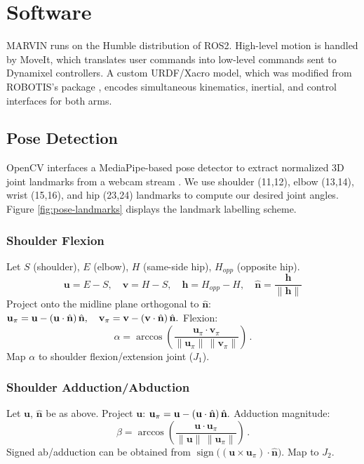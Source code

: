 \documentclass[acmsmall, screen]{acmart}
\begin{document}
\section{Software}
MARVIN runs on the Humble distribution of ROS2. High-level motion is handled by MoveIt, which translates user commands into low-level commands sent to Dynamixel controllers. A custom URDF/Xacro model, which was modified from ROBOTIS's package \cite{OpenManipulator2025}, encodes simultaneous kinematics, inertial, and control interfaces for both arms.

\subsection{Pose Detection}
OpenCV interfaces a MediaPipe-based pose detector to extract normalized 3D joint landmarks from a webcam stream \cite{noauthor_mediapipe_nodate}. We use shoulder (11,12), elbow (13,14), wrist (15,16), and hip (23,24) landmarks to compute our desired joint angles. Figure \ref{fig:pose-landmarks} displays the landmark labelling scheme.

\subsubsection{Shoulder Flexion}
Let $S$ (shoulder), $E$ (elbow), $H$ (same-side hip), $H_{opp}$ (opposite hip).
\begin{displaymath}
  \mathbf{u}=E-S,\quad \mathbf{v}=H-S,\quad \mathbf{h}=H_{opp}-H,\quad \hat{\mathbf{n}}=\frac{\mathbf{h}}{\lVert\mathbf{h}\rVert}
\end{displaymath}
Project onto the midline plane orthogonal to $\hat{\mathbf{n}}$:
$
\mathbf{u}_\pi=\mathbf{u}-(\mathbf{u}\cdot\hat{\mathbf{n}})\,\hat{\mathbf{n}},\quad
\mathbf{v}_\pi=\mathbf{v}-(\mathbf{v}\cdot\hat{\mathbf{n}})\,\hat{\mathbf{n}}. \\
$
Flexion:
\begin{equation}
\alpha=\arccos \!\left( \frac{\mathbf{u}_\pi \cdot \mathbf{v}_\pi}{\lVert\mathbf{u}_\pi\rVert\, \lVert\mathbf{v}_\pi\rVert} \right)\,.
\end{equation}
Map $\alpha$ to shoulder flexion/extension joint ($J_1$).

\subsubsection{Shoulder Adduction/Abduction}
Let $\mathbf{u}$, $\hat{\mathbf{n}}$ be as above. Project $\mathbf{u}$:
$
\mathbf{u}_\pi=\mathbf{u}-(\mathbf{u}\cdot\hat{\mathbf{n}})\,\hat{\mathbf{n}}.\\
$
Adduction magnitude:
\begin{equation}
\beta=\arccos \!\left( \frac{\mathbf{u}\cdot\mathbf{u}_\pi}{\lVert\mathbf{u}\rVert\, \lVert\mathbf{u}_\pi\rVert} \right)\,.
\end{equation}
Signed ab/adduction can be obtained from $\operatorname{sign}\big((\mathbf{u}\times\mathbf{u}_\pi)\cdot\hat{\mathbf{n}}\big)$. Map to $J_2$.
\end{document}
